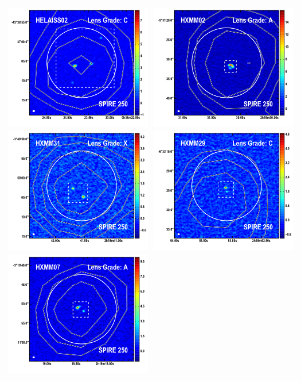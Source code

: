 \documentclass[iop]{emulateapj}
\begin{document}


\begin{figure}[!tbp] 
    \begin{centering}
\includegraphics[width=0.331\textwidth]{../Figures/overlays/HELAISS02_870_250.pdf}
\includegraphics[width=0.331\textwidth]{../Figures/overlays/HXMM02_870_250.pdf}
\includegraphics[width=0.331\textwidth]{../Figures/overlays/HXMM31_870_250.pdf}
\includegraphics[width=0.331\textwidth]{../Figures/overlays/HXMM29_870_250.pdf}
\includegraphics[width=0.331\textwidth]{../Figures/overlays/HXMM07_870_250.pdf}

\end{centering}
\end{figure}
\end{document}
